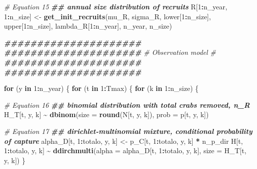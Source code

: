 \documentclass[
]{article}
\newenvironment{Shaded}{\begin{snugshade}}{\end{snugshade}}
\newcommand{\AttributeTok}[1]{\textcolor[rgb]{0.13,0.29,0.53}{#1}}
\newcommand{\CommentTok}[1]{\textcolor[rgb]{0.56,0.35,0.01}{\textit{#1}}}
\newcommand{\ControlFlowTok}[1]{\textcolor[rgb]{0.13,0.29,0.53}{\textbf{#1}}}
\newcommand{\DecValTok}[1]{\textcolor[rgb]{0.00,0.00,0.81}{#1}}
\newcommand{\DocumentationTok}[1]{\textcolor[rgb]{0.56,0.35,0.01}{\textbf{\textit{#1}}}}
\newcommand{\FunctionTok}[1]{\textcolor[rgb]{0.13,0.29,0.53}{\textbf{#1}}}
\newcommand{\NormalTok}[1]{#1}
\newcommand{\OtherTok}[1]{\textcolor[rgb]{0.56,0.35,0.01}{#1}}
\newcommand{\SpecialCharTok}[1]{\textcolor[rgb]{0.81,0.36,0.00}{\textbf{#1}}}
\begin{document}
\begin{Shaded}
\begin{Highlighting}[]
  \CommentTok{\# Equation 15}
  \DocumentationTok{\#\# annual size distribution of recruits}
\NormalTok{  R[}\DecValTok{1}\SpecialCharTok{:}\NormalTok{n\_year, }\DecValTok{1}\SpecialCharTok{:}\NormalTok{n\_size] }\OtherTok{\textless{}{-}} \FunctionTok{get\_init\_recruits}\NormalTok{(mu\_R, sigma\_R, lower[}\DecValTok{1}\SpecialCharTok{:}\NormalTok{n\_size], }
\NormalTok{                                             upper[}\DecValTok{1}\SpecialCharTok{:}\NormalTok{n\_size], }
\NormalTok{                                             lambda\_R[}\DecValTok{1}\SpecialCharTok{:}\NormalTok{n\_year], n\_year,}
\NormalTok{                                             n\_size)}
  
  \DocumentationTok{\#\#\#\#\#\#\#\#\#\#\#\#\#\#\#\#\#\#\#\#\#}
  \DocumentationTok{\#\#\#\#\#\#\#\#\#\#\#\#\#\#\#\#\#\#\#\#\#}
  \CommentTok{\# Observation model \#}
  \DocumentationTok{\#\#\#\#\#\#\#\#\#\#\#\#\#\#\#\#\#\#\#\#\#}
  \DocumentationTok{\#\#\#\#\#\#\#\#\#\#\#\#\#\#\#\#\#\#\#\#\#}
  
  \ControlFlowTok{for}\NormalTok{ (y }\ControlFlowTok{in} \DecValTok{1}\SpecialCharTok{:}\NormalTok{n\_year) \{}
    \ControlFlowTok{for}\NormalTok{ (t }\ControlFlowTok{in} \DecValTok{1}\SpecialCharTok{:}\NormalTok{Tmax) \{}
      \ControlFlowTok{for}\NormalTok{ (k }\ControlFlowTok{in} \DecValTok{1}\SpecialCharTok{:}\NormalTok{n\_size) \{}
        
        \CommentTok{\# Equation 16}
        \DocumentationTok{\#\# binomial distribution with total crabs removed, n\_R}
\NormalTok{        H\_T[t, y, k] }\SpecialCharTok{\textasciitilde{}} \FunctionTok{dbinom}\NormalTok{(}\AttributeTok{size =} \FunctionTok{round}\NormalTok{(N[t, y, k]), }\AttributeTok{prob =}\NormalTok{ p[t, y, k])}

        \CommentTok{\# Equation 17}
        \DocumentationTok{\#\# dirichlet{-}multinomial mixture, conditional probability of capture}
\NormalTok{        alpha\_D[t, }\DecValTok{1}\SpecialCharTok{:}\NormalTok{totalo, y, k] }\OtherTok{\textless{}{-}}\NormalTok{ p\_C[t, }\DecValTok{1}\SpecialCharTok{:}\NormalTok{totalo, y, k] }\SpecialCharTok{*}\NormalTok{ n\_p\_dir}
\NormalTok{        H[t, }\DecValTok{1}\SpecialCharTok{:}\NormalTok{totalo, y, k] }\SpecialCharTok{\textasciitilde{}} \FunctionTok{ddirchmulti}\NormalTok{(}\AttributeTok{alpha =}\NormalTok{ alpha\_D[t, }\DecValTok{1}\SpecialCharTok{:}\NormalTok{totalo, y, k],}
                                             \AttributeTok{size =}\NormalTok{ H\_T[t, y, k])}
\NormalTok{      \}}
      

\end{Highlighting}
\end{Shaded}
\end{document}

